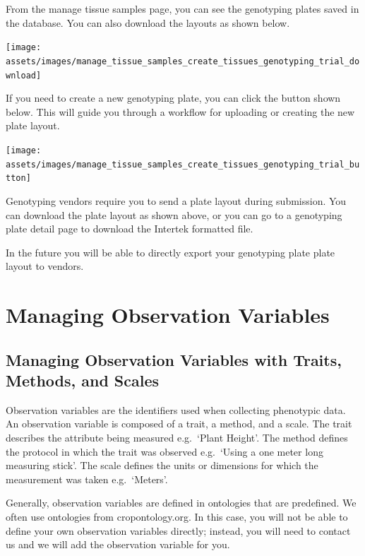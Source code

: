 \documentclass[
  12pt,
]{book}
\begin{document}
From the manage tissue samples page, you can see the genotyping plates saved in the database. You can also download the layouts as shown below.

\begin{center}\texttt{[image: assets/images/manage\_tissue\_samples\_create\_tissues\_genotyping\_trial\_download]} \end{center}

If you need to create a new genotyping plate, you can click the button shown below. This will guide you through a workflow for uploading or creating the new plate layout.

\begin{center}\texttt{[image: assets/images/manage\_tissue\_samples\_create\_tissues\_genotyping\_trial\_button]} \end{center}

Genotyping vendors require you to send a plate layout during submission. You can download the plate layout as shown above, or you can go to a genotyping plate detail page to download the Intertek formatted file.

In the future you will be able to directly export your genotyping plate plate layout to vendors.

\hypertarget{managing-observation-variables}{%
\chapter{Managing Observation Variables}\label{managing-observation-variables}}

\hypertarget{managing-observation-variables-with-traits-methods-and-scales}{%
\section{Managing Observation Variables with Traits, Methods, and Scales}\label{managing-observation-variables-with-traits-methods-and-scales}}

Observation variables are the identifiers used when collecting phenotypic data. An observation variable is composed of a trait, a method, and a scale. The trait describes the attribute being measured e.g.~`Plant Height'. The method defines the protocol in which the trait was observed e.g.~`Using a one meter long measuring stick'. The scale defines the units or dimensions for which the measurement was taken e.g.~`Meters'.

Generally, observation variables are defined in ontologies that are predefined. We often use ontologies from cropontology.org. In this case, you will not be able to define your own observation variables directly; instead, you will need to contact us and we will add the observation variable for you.
\end{document}
